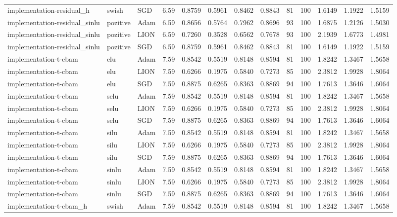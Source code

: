 \begin{table}[htbp]
{\begin{tabular}{lllrrrrrrrrrr}
implementation-residual_h & swish & SGD & 6.59 & 0.8759 & 0.5961 & 0.8462 & 0.8843 & 81 & 100 & 1.6149 & 1.1922 & 1.5159 \\
implementation-residual_sinlu & pozitive & Adam & 6.59 & 0.8656 & 0.5764 & 0.7962 & 0.8696 & 93 & 100 & 1.6875 & 1.2126 & 1.5030 \\
implementation-residual_sinlu & pozitive & LION & 6.59 & 0.7260 & 0.3528 & 0.6562 & 0.7678 & 93 & 100 & 2.1939 & 1.6773 & 1.4981 \\
implementation-residual_sinlu & pozitive & SGD & 6.59 & 0.8759 & 0.5961 & 0.8462 & 0.8843 & 81 & 100 & 1.6149 & 1.1922 & 1.5159 \\
implementation-t-cbam & elu & Adam & 7.59 & 0.8542 & 0.5519 & 0.8148 & 0.8594 & 81 & 100 & 1.8242 & 1.3467 & 1.5658 \\
implementation-t-cbam & elu & LION & 7.59 & 0.6266 & 0.1975 & 0.5840 & 0.7273 & 85 & 100 & 2.3812 & 1.9928 & 1.8064 \\
implementation-t-cbam & elu & SGD & 7.59 & 0.8875 & 0.6265 & 0.8363 & 0.8869 & 94 & 100 & 1.7613 & 1.3646 & 1.6064 \\
implementation-t-cbam & selu & Adam & 7.59 & 0.8542 & 0.5519 & 0.8148 & 0.8594 & 81 & 100 & 1.8242 & 1.3467 & 1.5658 \\
implementation-t-cbam & selu & LION & 7.59 & 0.6266 & 0.1975 & 0.5840 & 0.7273 & 85 & 100 & 2.3812 & 1.9928 & 1.8064 \\
implementation-t-cbam & selu & SGD & 7.59 & 0.8875 & 0.6265 & 0.8363 & 0.8869 & 94 & 100 & 1.7613 & 1.3646 & 1.6064 \\
implementation-t-cbam & silu & Adam & 7.59 & 0.8542 & 0.5519 & 0.8148 & 0.8594 & 81 & 100 & 1.8242 & 1.3467 & 1.5658 \\
implementation-t-cbam & silu & LION & 7.59 & 0.6266 & 0.1975 & 0.5840 & 0.7273 & 85 & 100 & 2.3812 & 1.9928 & 1.8064 \\
implementation-t-cbam & silu & SGD & 7.59 & 0.8875 & 0.6265 & 0.8363 & 0.8869 & 94 & 100 & 1.7613 & 1.3646 & 1.6064 \\
implementation-t-cbam & sinlu & Adam & 7.59 & 0.8542 & 0.5519 & 0.8148 & 0.8594 & 81 & 100 & 1.8242 & 1.3467 & 1.5658 \\
implementation-t-cbam & sinlu & LION & 7.59 & 0.6266 & 0.1975 & 0.5840 & 0.7273 & 85 & 100 & 2.3812 & 1.9928 & 1.8064 \\
implementation-t-cbam & sinlu & SGD & 7.59 & 0.8875 & 0.6265 & 0.8363 & 0.8869 & 94 & 100 & 1.7613 & 1.3646 & 1.6064 \\
implementation-t-cbam_h & swish & Adam & 7.59 & 0.8542 & 0.5519 & 0.8148 & 0.8594 & 81 & 100 & 1.8242 & 1.3467 & 1.5658 \\

\end{tabular}}
\end{table}
